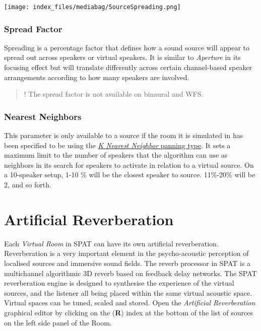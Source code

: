 \documentclass[
  letterpaper,
  DIV=11,
  numbers=noendperiod]{scrreport}
\begin{document}
\texttt{[image: index\_files/mediabag/SourceSpreading.png]}

\hypertarget{spread-factor}{%
\subsection{Spread Factor}\label{spread-factor}}

Spreading is a percentage factor that defines how a sound source will
appear to spread out across speakers or virtual speakers. It is similar
to \emph{Aperture} in its focusing effect but will translate differently
across certain channel-based speaker arrangements according to how many
speakers are involved.

\begin{quote}
! The spread factor is not available on binaural and WFS.
\end{quote}

\hypertarget{nearest-neighbors}{%
\subsection{Nearest Neighbors}\label{nearest-neighbors}}

This parameter is only available to a source if the room it is simulated
in has been specified to be using the
\href{Spatialisation_Technology_Panning_Algorithms?id=k-nearest-neighbor-knn}{\emph{K
Nearest Neighbor} panning type}. It sets a maximum limit to the number
of speakers that the algorithm can use as neighbors in its search for
speakers to activate in relation to a virtual source. On a 10-speaker
setup, 1-10 \% will be the closest speaker to source. 11\%-20\% will be
2, and so forth.

\hypertarget{artificial-reverberation}{%
\chapter{Artificial Reverberation}\label{artificial-reverberation}}

Each \emph{Virtual Room} in SPAT can have its own artificial
reverberation. Reverberation is a very important element in the
psycho-acoustic perception of localised sources and immersive sound
fields. The reverb processor in SPAT is a multichannel algorithmic 3D
reverb based on feedback delay networks. The SPAT reverberation engine
is designed to synthesise the experience of the virtual sources, and the
listener all being placed within the same virtual acoustic space.
Virtual spaces can be tuned, scaled and stored. Open the
\emph{Artificial Reverberation} graphical editor by clicking on the
(\textbf{R}) index at the bottom of the list of sources on the left side
panel of the Room.
\end{document}
